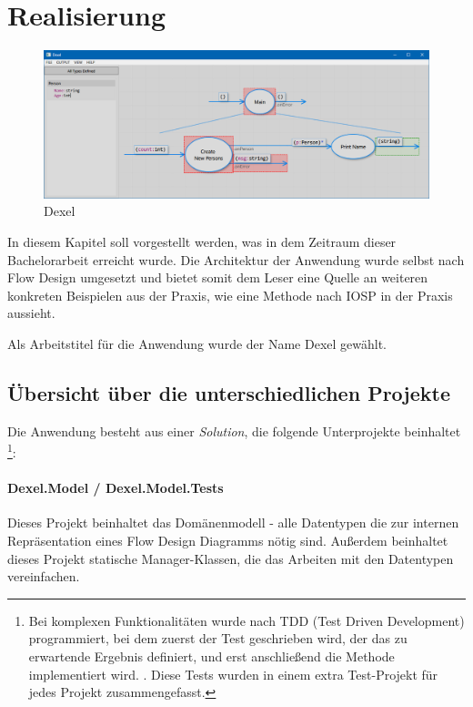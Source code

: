 


\chapter{Realisierung }

	\begin{figure}[H]
		\centering
		\includegraphics[width=1\linewidth]{./img/Dexel.png} 
		\caption{Dexel}
	\end{figure}


In diesem Kapitel soll vorgestellt werden, was in dem Zeitraum dieser
Bachelorarbeit erreicht wurde. Die Architektur der Anwendung wurde selbst nach
Flow Design umgesetzt und bietet somit dem Leser eine Quelle an weiteren
konkreten Beispielen aus der Praxis, wie eine Methode nach IOSP in der Praxis aussieht.

Als Arbeitstitel für die Anwendung wurde der Name Dexel gewählt.

\section{Übersicht über die unterschiedlichen Projekte}

Die Anwendung besteht aus einer \textit{Solution}, die folgende Unterprojekte beinhaltet \footnote{Bei komplexen Funktionalitäten wurde nach TDD (Test Driven Development)
programmiert, bei dem zuerst der Test geschrieben wird, der das zu erwartende
Ergebnis definiert, und erst anschließend die Methode implementiert wird.
. Diese Tests wurden in einem extra Test-Projekt für jedes Projekt zusammengefasst.}:

\subsubsection{Dexel.Model / Dexel.Model.Tests}

Dieses Projekt beinhaltet das Domänenmodell - alle Datentypen die zur internen Repräsentation
eines Flow Design Diagramms nötig sind. Außerdem beinhaltet dieses Projekt
statische Manager-Klassen, die das Arbeiten mit den Datentypen vereinfachen.


